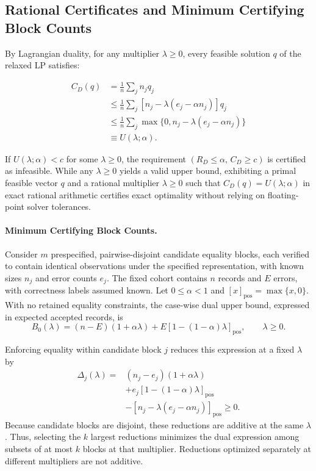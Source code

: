 \documentclass[letterpaper]{article}
\begin{document}
\subsection{Rational Certificates and Minimum Certifying Block Counts}

By Lagrangian duality, for any multiplier \(\lambda \geq 0\), every feasible solution \(q\) of the relaxed LP satisfies:

\[\begin{aligned}
C_D(q) &= \frac{1}{n}\sum_j n_jq_j \\
&\leq\frac{1}{n}\sum_j [n_j-\lambda(e_j-\alpha n_j)]q_j \\
&\leq\frac{1}{n}\sum_j\max\{0,n_j-\lambda(e_j-\alpha n_j)\}\\
&\equiv U(\lambda;\alpha).
\end{aligned}\]

If \(U(\lambda;\alpha) < c\) for some \(\lambda \geq 0\), the requirement \(\left( R_{D} \leq \alpha,\, C_{D} \geq c \right)\) is certified as infeasible. While any \(\lambda \geq 0\) yields a valid upper bound, exhibiting a primal feasible vector \(q\) and a rational multiplier \(\lambda \geq 0\) such that \(C_{D}(q) = U(\lambda;\alpha)\) in exact rational arithmetic certifies exact optimality without relying on floating-point solver tolerances.

\paragraph{Minimum Certifying Block Counts.}
Consider \(m\) prespecified, pairwise-disjoint candidate equality blocks, each verified to contain identical observations under the specified representation, with known sizes \(n_j\) and error counts \(e_j\). The fixed cohort contains \(n\) records and \(E\) errors, with correctness labels assumed known. Let \(0\leq\alpha<1\) and \([x]_{\mathrm{pos}}=\max\{x,0\}\). With no retained equality constraints, the case-wise dual upper bound, expressed in expected accepted records, is
\[
B_0(\lambda)
=(n-E)(1+\alpha\lambda)
+E[1-(1-\alpha)\lambda]_{\mathrm{pos}},
\qquad \lambda\geq 0.
\]

Enforcing equality within candidate block \(j\) reduces this expression at a fixed \(\lambda\) by
\[
\begin{aligned}
\Delta_j(\lambda)
={}&(n_j-e_j)(1+\alpha\lambda)\\
&+e_j[1-(1-\alpha)\lambda]_{\mathrm{pos}}\\
&-[n_j-\lambda(e_j-\alpha n_j)]_{\mathrm{pos}}
\geq 0.
\end{aligned}
\]
Because candidate blocks are disjoint, these reductions are additive at the same \(\lambda\). Thus, selecting the \(k\) largest reductions minimizes the dual expression among subsets of at most \(k\) blocks at that multiplier. Reductions optimized separately at different multipliers are not additive.
\end{document}

